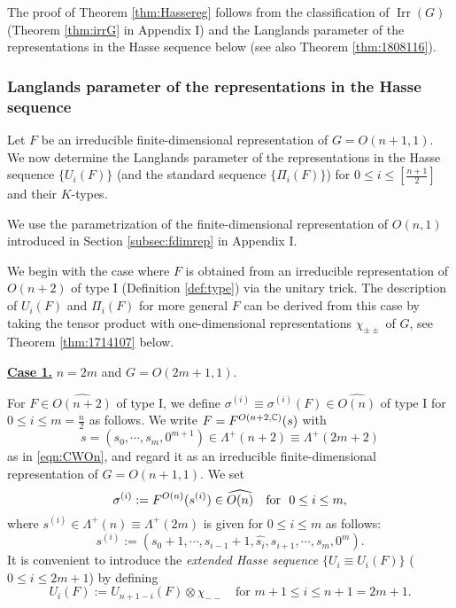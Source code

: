 The proof of Theorem \ref{thm:Hassereg} follows from the classification
 of $\operatorname{Irr}(G)$
 (Theorem \ref{thm:irrG} in Appendix I)
 and the Langlands parameter of the representations
 in the Hasse sequence below
 (see also Theorem \ref{thm:1808116}).  

\subsubsection{Langlands parameter of the representations
 in the Hasse sequence}
\label{subsec:LanHasse}
Let $F$  be an irreducible finite-dimensional representation of $G=O(n+1,1)$. 
 We now determine the Langlands parameter of the representations in the Hasse sequence  $\{ U_i(F) \}$ (and the standard sequence $\{ \Pi_i(F) \}$)  for $0 \le i \le [\frac {n+1}2]$  and their $K$-types.



We use the parametrization of the finite-dimensional representation
 of $O(n,1)$ introduced in Section \ref{subsec:fdimrep} in Appendix I.  



We begin with the case
 where $F$ is obtained from an irreducible representation 
 of $O(n+2)$ of 
 type I (Definition \ref{def:type})
 via the unitary trick.
The description of $U_i(F)$ and $\Pi_i(F)$
 for more general $F$ can be derived from this case
 by taking the tensor product with one-dimensional representations 
 $\chi_{\pm\pm}$
 of $G$, 
 see Theorem \ref{thm:1714107} below.  

\vskip 1pc
\par\noindent
{\bf{\underline{Case 1.}}}\enspace
$n=2m$ and $G=O(2m+1,1)$.  

For $F \in \widehat{O(n+2)}$ of type I, 
 we define $\sigma^{(i)} \equiv \sigma^{(i)}(F) \in \widehat{O(n)}$
 of type I for $0 \le i \le m = \frac n 2$
 as follows.  
We write $F= F^{{O(n+2, {\mathbb{C}})}}({s})$
 with 
\[
   s=(s_{0},\cdots,s_{m},0^{m+1}) \in \Lambda^+(n+2)\equiv \Lambda^+(2m+2)
\]
 as in \eqref{eqn:CWOn}, 
 and regard it as an irreducible finite-dimensional representation
 of $G=O(n+1,1)$.  
We set
\[
   \sigma^{(i)} : = F^{{O(n)}}({s^{(i)}}) \in \widehat{O(n)}
\quad
  \text{for }\,\, 0 \le i \le m, 
\]
where
 $s^{(i)}\in\Lambda^+(n)\equiv \Lambda^+(2m)$ is given 
 for $0 \le i \le m$ as follows:
\begin{equation}
\label{eqn:sin=2m}
  s^{(i)}
  :=
  (s_{0}+1,\cdots,s_{i-1}+1,\widehat {s_{i}},s_{i+1},\cdots,s_{m},0^m). 
\end{equation}
It is convenient to introduce the {\em extended Hasse sequence}
 $\{U_i \equiv U_i(F)\}$
 ($0 \le i \le 2m+1$) by defining 
\begin{equation}
\label{eqn:Uiext1}
   U_i(F):=U_{n+1-i}(F) \otimes \chi_{--}
\quad
\text{for  $m+1 \le i \le n+1 = 2m+1$}.  
\end{equation}


